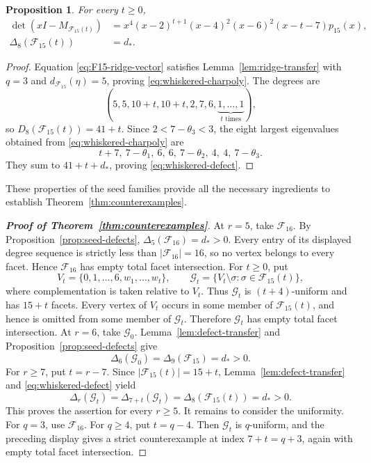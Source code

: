 \documentclass[11pt]{article}
\newtheorem{proposition}[theorem]{Proposition}
\newcommand{\calF}{\mathcal{F}}
\begin{document}
	\begin{proposition}\label{prop:whiskered-seed}
		For every \(t\ge0\),
		\begin{align}
			\det(xI-M_{\calF_{15}(t)})
			&=x^4(x-2)^{t+1}(x-4)^2(x-6)^2(x-t-7)p_{15}(x),
			\label{eq:whiskered-charpoly}\\
			\Delta_8(\calF_{15}(t))&=d_*.\label{eq:whiskered-defect}
		\end{align}
	\end{proposition}
	
	\begin{proof}
		Equation \eqref{eq:F15-ridge-vector} satisfies
		Lemma~\ref{lem:ridge-transfer} with \(q=3\) and \(d_{\calF_{15}}(\eta)=5\), proving
		\eqref{eq:whiskered-charpoly}.  The degrees are
		\[
		(5,5,10+t,10+t,2,7,6,
		\underbrace{1,\ldots,1}_{t\text{ times}}),
		\]
		so \(D_8(\calF_{15}(t))=41+t\).  Since \(2<7-\theta_3<3\), the eight
		largest eigenvalues obtained from \eqref{eq:whiskered-charpoly} are
		\[
		t+7,\ 7-\theta_1,\ 6,\ 6,\ 7-\theta_2,\ 4,\ 4,\ 7-\theta_3.
		\]
		They sum to \(41+t+d_*\), proving
		\eqref{eq:whiskered-defect}.
	\end{proof}
	
These properties of the seed families provide all the necessary ingredients to establish Theorem~\ref{thm:counterexamples}.
	\begin{proof}[\textup{\textbf{Proof of Theorem~\ref{thm:counterexamples}}}]
		At \(r=5\), take \(\calF_{16}\).  By
		Proposition~\ref{prop:seed-defects},
		$\Delta_5(\calF_{16})=d_*>0.$
		Every entry of its displayed degree sequence is strictly less than
		\(|\calF_{16}|=16\), so no vertex belongs to every facet.  Hence
		\(\calF_{16}\) has empty total facet intersection.
		For \(t\ge0\), put
		\[
			V_t=\{0,1,\ldots,6,w_1,\ldots,w_t\},
			\qquad
			\mathcal G_t
			=\{V_t\setminus\sigma:\sigma\in\calF_{15}(t)\},
		\]
		where complementation is taken relative to \(V_t\). Thus
		\(\mathcal G_t\) is \((t+4)\)-uniform and has \(15+t\) facets.
		Every vertex of \(V_t\) occurs in some member of
		\(\calF_{15}(t)\), and hence is omitted from some member of
		\(\mathcal G_t\). Therefore \(\mathcal G_t\) has empty total facet
		intersection.
		At \(r=6\), take \(\mathcal G_0\). Lemma~\ref{lem:defect-transfer}
		and Proposition~\ref{prop:seed-defects} give
		\[
			\Delta_6(\mathcal G_0)
			=\Delta_9(\calF_{15})=d_*>0.
		\]
		For \(r\ge7\), put \(t=r-7\). Since
		\(|\calF_{15}(t)|=15+t\), Lemma~\ref{lem:defect-transfer} and
		\eqref{eq:whiskered-defect} yield
		\[
			\Delta_r(\mathcal G_t)
			=\Delta_{7+t}(\mathcal G_t)
			=\Delta_8(\calF_{15}(t))
			=d_*>0.
		\]
		This proves the assertion for every \(r\ge5\).
		It remains to consider the uniformity.  For \(q=3\), use
		\(\calF_{16}\).  For \(q\ge4\), put \(t=q-4\).  Then
		\(\mathcal G_t\) is \(q\)-uniform, and the preceding display gives
		a strict counterexample at index \(7+t=q+3\), again with empty total
		facet intersection.
	\end{proof}
	
\end{document}
